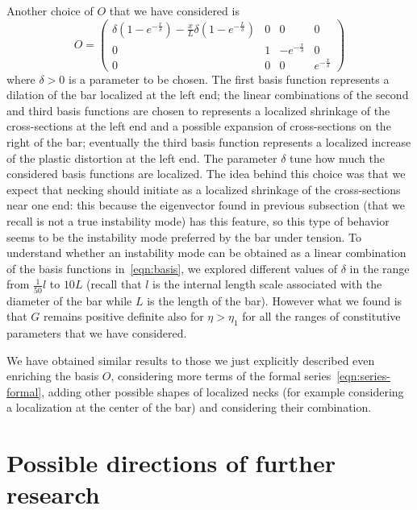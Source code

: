 \documentclass[a4paper,10pt,twoside]{amsbook}
\numberwithin{section}{chapter}
\numberwithin{equation}{chapter}
\theoremstyle{definition}
\begin{document}
Another choice of $O$ that we have considered is
\begin{equation}
\label{eqn:basis}
O=\begin{pmatrix}
\delta\left(1-e^{-\frac{x}{\delta}}\right)-\frac{x}{L}\delta\left(1-e^{-\frac{L}{\delta}}\right) & 0 & 0 & 0 \\
0 & 1 & -e^{-\frac{x}{\delta}} & 0 \\
0 & 0 & 0 & e^{-\frac{x}{\delta}}
\end{pmatrix}
\end{equation}
where $\delta>0$ is a parameter to be chosen. The first basis function represents a dilation of the bar localized at the left end; the linear combinations of the second and third basis functions are chosen to represents a localized shrinkage of the cross-sections at the left end and a possible expansion of cross-sections on the right of the bar; eventually the third basis function represents a localized increase of the plastic distortion at the left end. The parameter $\delta$ tune how much the considered basis functions are localized. The idea behind this choice was that we expect that necking should initiate as a localized shrinkage of the cross-sections near one end: this because the eigenvector found in previous subsection (that we recall is not a true instability mode) has this feature, so this type of behavior seems to be the instability mode preferred by the bar under tension. To understand whether an instability mode can be obtained as a linear combination of the basis functions in~\eqref{eqn:basis}, we explored different values of $\delta$ in the range from $\frac{1}{50}l$ to $10 L$ (recall that $l$ is the internal length scale associated with the diameter of the bar while $L$ is the length of the bar). However what we found is that $G$ remains positive definite also for $\eta>\eta_1$ for all the ranges of constitutive parameters that we have considered.

We have obtained similar results to those we just explicitly described even enriching the basis $O$, considering more terms of the formal series~\eqref{eqn:series-formal}, adding other possible shapes of localized necks (for example considering a localization at the center of the bar) and considering their combination.


\section{Possible directions of further research}
\label{sec:directions-necking}
\end{document}
